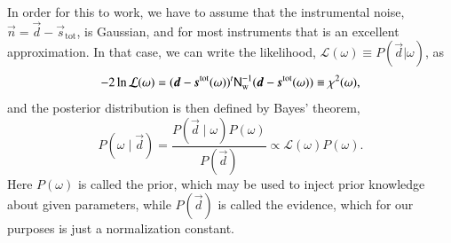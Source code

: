 \documentclass[twocolumn]{aa}
\newcommand{\dv}[0]{\vec{d}}
\newcommand{\n}[0]{\vec{n}}
\newcommand{\s}[0]{\vec{s}}
\newcommand{\N}[0]{\tens{N}}
\begin{document}
In order for this to work, we have to assume that the instrumental
noise, $\n=\dv-\s_{\mathrm{tot}}$, is Gaussian, and for most
instruments that is an excellent approximation. In that case, we can
write the likelihood, $\mathcal{L}(\omega) \equiv P(\dv|\omega)$, as
\begin{equation}
-2\ln\mathcal{L}(\omega) = (\dv-\s^{\mathrm{tot}}(\omega))^t
  \N_{\mathrm{w}}^{-1}(\dv-\s^{\mathrm{tot}}(\omega)) \equiv \chi^2(\omega),
\end{equation}
and the posterior distribution is then defined by Bayes' theorem,
\begin{equation}
P(\omega\mid\dv) = \frac{P(\dv\mid\omega) P(\omega)}{P(\dv)} \propto
\mathcal{L}(\omega) P(\omega).
\end{equation}
Here $P(\omega)$ is called the prior, which may be used to inject
prior knowledge about given parameters, while $P(\dv)$ is called the
evidence, which for our purposes is just a normalization constant.
\end{document}
